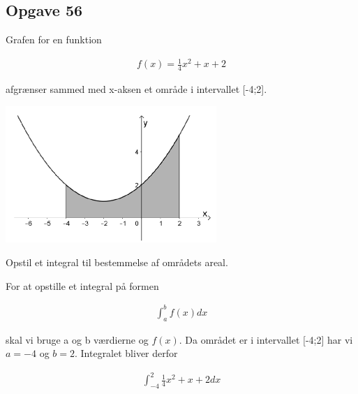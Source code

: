 \subsection{Opgave 56}

Grafen for en funktion 

\begin{align*}
    f(x) = \frac{1}{4}x^2 + x + 2
\end{align*}

afgrænser sammed med x-aksen et område i intervallet [-4;2].

\includegraphics[width=8cm]{Opgave_51-56/Opgave_56/56.png}

Opstil et integral til bestemmelse af områdets areal.

\ans

For at opstille et integral på formen 

\begin{align*}
    \int_a^b f(x) dx
\end{align*}

skal vi bruge a og b værdierne og $f(x)$. Da området er i intervallet [-4;2] har vi $a = -4$ og $b = 2$.
Integralet bliver derfor

\begin{align*}
    \int_{-4}^{2} \frac{1}{4}x^2 + x + 2 dx
\end{align*}



